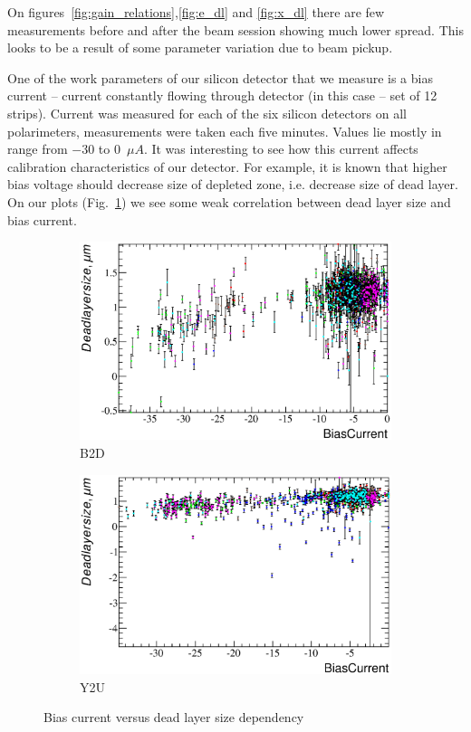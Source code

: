 \documentclass[a4paper,12pt]{article}
\begin{document}
On figures~\ref{fig:gain_relations},\ref{fig:e_dl} and \ref{fig:x_dl} there are few measurements
before and after the beam session showing much lower spread. This looks to be a result of some
parameter variation due to beam pickup.

One of the work parameters of our silicon detector that we measure is a bias current -- current
constantly flowing through detector (in this case -- set of 12 strips). Current was measured
for each of the six silicon detectors on all polarimeters, measurements were taken each five
minutes. Values lie mostly in range from $-30$ to $0$~$\mu A$. It was interesting to see how
this current affects calibration characteristics of our detector. For example, it is known 
that higher bias voltage should decrease size of depleted zone, i.e. decrease size of dead layer.
On our plots (Fig.~\ref{fig:bc_vs_xdl}) we see some weak correlation between dead layer size and bias
current.

\newcommand\bcvsxdllabel{Bias current versus dead layer size dependency}
\begin{figure}[p]
\begin{subfigure}[b]{0.5\textwidth}
\includegraphics[width=\textwidth]{gfx/run13_alpha_study/B2D/c_hBiasCurrent_DeadLayerSize.eps}
\caption{B2D}
\end{subfigure}
\begin{subfigure}[b]{0.5\textwidth}
\includegraphics[width=\textwidth]{gfx/run13_alpha_study/Y2U/c_hBiasCurrent_DeadLayerSize.eps}
\caption{Y2U}
\end{subfigure}
\caption{\bcvsxdllabel}
\label{fig:bc_vs_xdl}
\end{figure}
\end{document}
